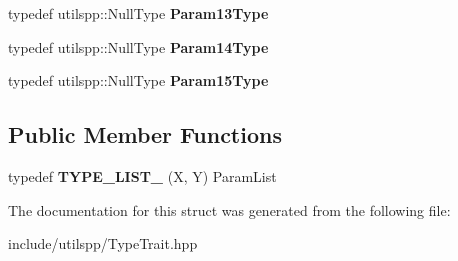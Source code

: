 \begin{DoxyCompactItemize}
\item 
\hypertarget{structutilspp_1_1PointerOnMemberFunction_3_01W_07V_1_1_5_08_07X_00_01Y_08_4_a564f922c79a6922b899d3dcfb23c24dd}{typedef utilspp\-::\-Null\-Type {\bfseries Param13\-Type}}\label{structutilspp_1_1PointerOnMemberFunction_3_01W_07V_1_1_5_08_07X_00_01Y_08_4_a564f922c79a6922b899d3dcfb23c24dd}

\item 
\hypertarget{structutilspp_1_1PointerOnMemberFunction_3_01W_07V_1_1_5_08_07X_00_01Y_08_4_a2d21c4bd81e838f616db2922f0dcd9ea}{typedef utilspp\-::\-Null\-Type {\bfseries Param14\-Type}}\label{structutilspp_1_1PointerOnMemberFunction_3_01W_07V_1_1_5_08_07X_00_01Y_08_4_a2d21c4bd81e838f616db2922f0dcd9ea}

\item 
\hypertarget{structutilspp_1_1PointerOnMemberFunction_3_01W_07V_1_1_5_08_07X_00_01Y_08_4_a4812f435293892e11c3d39530f1a1d35}{typedef utilspp\-::\-Null\-Type {\bfseries Param15\-Type}}\label{structutilspp_1_1PointerOnMemberFunction_3_01W_07V_1_1_5_08_07X_00_01Y_08_4_a4812f435293892e11c3d39530f1a1d35}

\end{DoxyCompactItemize}
\subsection*{Public Member Functions}
\begin{DoxyCompactItemize}
\item 
\hypertarget{structutilspp_1_1PointerOnMemberFunction_3_01W_07V_1_1_5_08_07X_00_01Y_08_4_a55fb8f0de803726154fff6d25853c6f0}{typedef {\bfseries T\-Y\-P\-E\-\_\-\-L\-I\-S\-T\-\_} (X, Y) Param\-List}\label{structutilspp_1_1PointerOnMemberFunction_3_01W_07V_1_1_5_08_07X_00_01Y_08_4_a55fb8f0de803726154fff6d25853c6f0}

\end{DoxyCompactItemize}


The documentation for this struct was generated from the following file\-:\begin{DoxyCompactItemize}
\item 
include/utilspp/Type\-Trait.\-hpp\end{DoxyCompactItemize}

